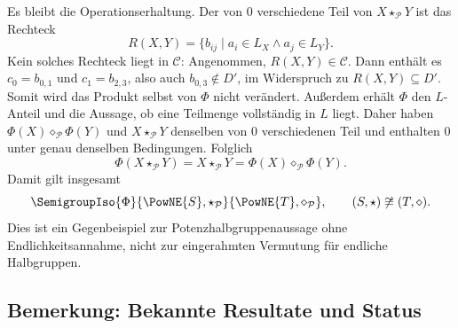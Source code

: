 \documentclass[main.tex]{subfiles}
\begin{document}
Es bleibt die Operationserhaltung.  Der von \(0\) verschiedene Teil von
\(X\star_{\mathcal P}Y\) ist das Rechteck
\[
  R(X,Y)=\{b_{ij}\mid a_i\in L_X\land a_j\in L_Y\}.
\]
Kein solches Rechteck liegt in \(\mathcal C\): Angenommen,
\(R(X,Y)\in\mathcal C\).  Dann enthält es \(c_0=b_{0,1}\) und
\(c_1=b_{2,3}\), also auch \(b_{0,3}\notin D'\), im Widerspruch zu
\(R(X,Y)\subseteq D'\).  Somit wird das Produkt selbst von \(\Phi\) nicht
verändert.  Außerdem erhält \(\Phi\) den \(L\)-Anteil und die
Aussage, ob eine Teilmenge vollständig in \(L\) liegt.  Daher haben
\(\Phi(X)\diamond_{\mathcal P}\Phi(Y)\) und
\(X\star_{\mathcal P}Y\) denselben von \(0\) verschiedenen Teil und enthalten
\(0\) unter genau denselben Bedingungen.  Folglich
\[
  \Phi(X\star_{\mathcal P}Y)
  =X\star_{\mathcal P}Y
  =\Phi(X)\diamond_{\mathcal P}\Phi(Y).
\]
Damit gilt insgesamt
\[
  \SemigroupIso{\Phi}
    {\PowNE{S},\star_{\mathcal P}}
    {\PowNE{T},\diamond_{\mathcal P}},
  \qquad
  (S,\star)\not\cong(T,\diamond).
\]
Dies ist ein Gegenbeispiel zur Potenzhalbgruppenaussage ohne
Endlichkeitsannahme, nicht zur eingerahmten Vermutung für endliche
Halbgruppen.

\subsection{Bemerkung: Bekannte Resultate und Status}
\end{document}
